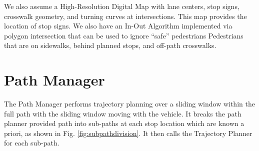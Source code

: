 \documentclass[letterpaper, 10 pt, conference]{ieeeconf}  %
\begin{document}


We also assume a High-Resolution Digital Map with lane centers, stop signs, crosswalk geometry, and turning curves at intersections.
This map provides the location of stop signs.
We also have an In-Out Algorithm implemented via polygon intersection that can be used to ignore “safe” pedestrians
Pedestrians that are on sidewalks, behind planned stops, and off-path crosswalks.



\section{Path Manager} \label{sec:pathmanager}


The Path Manager performs trajectory planning over a sliding window within the full path with the sliding window moving with the vehicle.
It breaks the path planner provided path into sub-paths at each stop location which are known a priori, as shown in Fig. \ref{fig:subpathdivision}. It then calls the Trajectory Planner for each sub-path.
\end{document}
